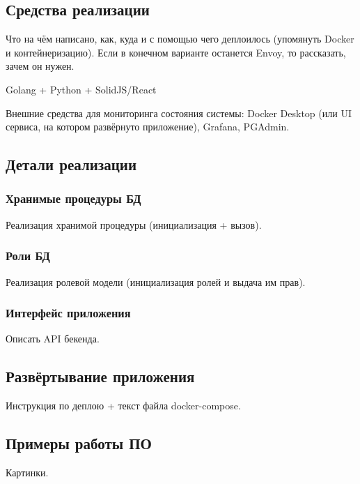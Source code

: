 \subsection{Средства реализации}

Что на чём написано, как, куда и с помощью чего деплоилось (упомянуть Docker и контейнеризацию). Если в конечном варианте останется Envoy, то рассказать, зачем он нужен.

Golang + Python + SolidJS/React

Внешние средства для мониторинга состояния системы: Docker Desktop (или UI сервиса, на котором развёрнуто приложение), Grafana, PGAdmin.



\subsection{Детали реализации}

\subsubsection{Хранимые процедуры БД}

Реализация хранимой процедуры (инициализация + вызов).

\subsubsection{Роли БД}

Реализация ролевой модели (инициализация ролей и выдача им прав).

\subsubsection{Интерфейс приложения}

Описать API бекенда.

\subsection{Развёртывание приложения}

Инструкция по деплою + текст файла docker-compose.

\subsection{Примеры работы ПО}

Картинки.

\pagebreak